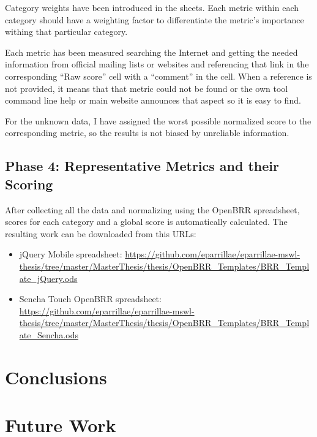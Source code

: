 \documentclass[a4paper,12pt]{book}
\begin{document}
Category weights have been introduced in the sheets. Each metric within each
category should have a weighting factor to differentiate the metric's
importance withing that particular category. 

Each metric has been measured searching the Internet and getting the needed information from official mailing lists or websites and referencing that link in the corresponding ``Raw score'' cell with a ``comment'' in the cell. When a
reference is not provided, it means that that metric could not be found or the own tool command line help or main website announces that aspect so it is
easy to find.

For the unknown data, I have assigned the worst possible normalized score to
the corresponding metric, so the results is not biased by unreliable
information.

\section{Phase 4: Representative Metrics and their Scoring}
\label{sec:phase4}

After collecting all the data and normalizing using the OpenBRR spreadsheet,
scores for each category and a global score is automatically calculated.
The resulting work can be downloaded from this URLs:

\begin{itemize}
 \item jQuery Mobile spreadsheet:
\url{
https://github.com/eparrillae/eparrillae-mswl-thesis/tree/master/MasterThesis/thesis/OpenBRR_Templates/BRR_Template_jQuery.ods}

 \item Sencha Touch OpenBRR spreadsheet:
\url{
https://github.com/eparrillae/eparrillae-mswl-thesis/tree/master/MasterThesis/thesis/OpenBRR_Templates/BRR_Template_Sencha.ods}
\end{itemize}



\chapter{Conclusions}
\label{chap:conclusions}




\chapter{Future Work}
\label{chap:future}
\end{document}
